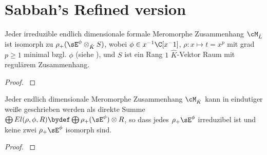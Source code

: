 \section{Sabbah's Refined version}
\begin{prop}
\cite[Prop 3.1]{sabbah_Fourier-local}
Jeder irreduzible endlich dimensionale formale Meromorphe Zusammenhang
$\cM_{\hat L}$ ist isomorph zu $\rho_+(\sE^\phi\otimes_{\hat K} S)$, wobei
$\phi\in x^{-1}\C[x^-1]$, $\rho:x\mapsto t=x^p$ mit grad $p\geq1$ minimal bzgl.
$\phi$ (siehe \cite[Rem 2.8]{sabbah_Fourier-local}), und $S$ ist ein Rang $1$
$\hat K$-Vektor Raum mit regulärem Zusammenhang.
\end{prop}
\begin{proof}
\cite[Prop 3.1]{sabbah_Fourier-local}
\end{proof}

\begin{thm}
\cite[Cor 3.3]{sabbah_Fourier-local}
Jeder endlich dimensionale Meromorphe Zusammenhang $\cM_{\hat K}$ kann in
eindutiger weiße geschrieben werden als direkte Summe $\bigoplus
El(\rho,\phi,R)\bydef\bigoplus\rho_+(\sE^\phi)\otimes R$, so dass
jedes $\rho_+\sE^\phi$ irreduzibel ist und keine zwei $\rho_+\sE^\phi$ isomorph
sind.
\end{thm}
\begin{comment}
In welchem Raum ist $\cM$ ?? in $L$ oder in $K$
\end{comment}
\begin{proof}
\cite[Cor 3.3]{sabbah_Fourier-local}
\end{proof}

